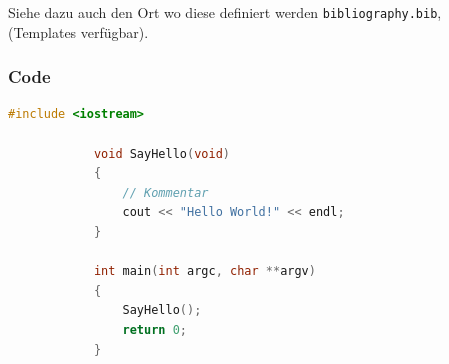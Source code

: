         Siehe dazu auch den Ort wo diese definiert werden \verb|bibliography.bib|, (Templates verfügbar).

        \subsubsection{Code}
        \begin{lstlisting}[language=C++,name={1. Beispiel},label={sc:bsp:1}]
            #include <iostream>

            void SayHello(void)
            {
                // Kommentar
                cout << "Hello World!" << endl;
            }

            int main(int argc, char **argv)
            {
                SayHello();
                return 0;
            }
            \end{lstlisting}

    

\clearpage